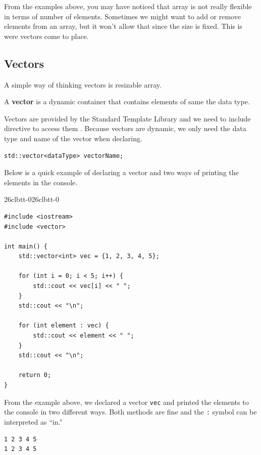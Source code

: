 \documentclass[../../../main.tex]{subfiles}
\begin{document}
From the examples above, you may have noticed that array is not
really flexible in terms of number of elements. Sometimes we
might want to add or remove elements from an array, but it won't
allow that since the size is fixed. This is were vectors come
to place.

\subsection{Vectors}

A simple way of thinking vectors is resizable array.

\begin{definition}{}{}
A \textbf{vector} is a dynamic container that contains elements of
same the data type.
\end{definition}

Vectors are provided by the Standard Template Library and we need
to include directive to access them \cite{CS02-5}. Because
vectors are dynamic, we only need the data type and name of the
vector when declaring.

\begin{outputbox}
\begin{lstlisting}[style=basic]
std::vector<dataType> vectorName;
\end{lstlisting}
\end{outputbox}

Below is a quick example of declaring a vector and two ways of
printing the elements in the console.

\begin{cppbox}{26clbtt-0}{26clbtt-0}
\begin{lstlisting}[style=cppstyle]
#include <iostream>
#include <vector>

int main() {
    std::vector<int> vec = {1, 2, 3, 4, 5};

    for (int i = 0; i < 5; i++) {
        std::cout << vec[i] << " ";
    }
    std::cout << "\n";

    for (int element : vec) {
        std::cout << element << " ";
    }
    std::cout << "\n";

    return 0;
}
\end{lstlisting}
\end{cppbox}

From the example above, we declared a vector \verb|vec| and printed
the elements to the console in two different ways. Both methods are
fine and the \verb|:| symbol can be interpreted as ``in.''

\begin{outputbox}
\begin{lstlisting}[style=basic]
1 2 3 4 5
1 2 3 4 5
\end{lstlisting}
\end{outputbox}
\end{document}
